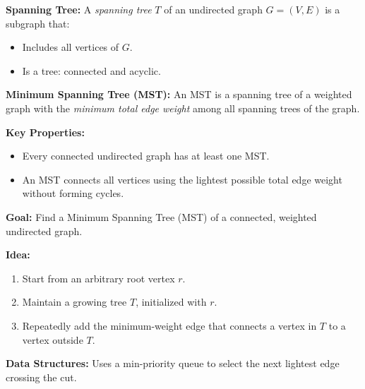 \documentclass[a4paper,landscape]{article}
\begin{document}
\begin{multicols}{7}
\tcolorbox[mybox={Spanning Trees}]
\textbf{Spanning Tree:}  
A \emph{spanning tree} $T$ of an undirected graph $G = (V, E)$ is a subgraph that:
\begin{itemize}[noitemsep, topsep=0pt]
    \item Includes all vertices of $G$.
    \item Is a tree: connected and acyclic.
\end{itemize}

\textbf{Minimum Spanning Tree (MST):}  
An MST is a spanning tree of a weighted graph with the \emph{minimum total edge weight} among all spanning trees of the graph.

\textbf{Key Properties:}
\begin{itemize}[noitemsep, topsep=0pt]
    \item Every connected undirected graph has at least one MST.
    \item An MST connects all vertices using the lightest possible total edge weight without forming cycles.
\end{itemize}
\endtcolorbox
\tcolorbox[mybox={Prim’s Algorithm}]
\textbf{Goal:} Find a Minimum Spanning Tree (MST) of a connected, weighted undirected graph.

\textbf{Idea:}
\begin{enumerate}[noitemsep, topsep=0pt]
    \item Start from an arbitrary root vertex $r$.
    \item Maintain a growing tree $T$, initialized with $r$.
    \item Repeatedly add the minimum-weight edge that connects a vertex in $T$ to a vertex outside $T$.
\end{enumerate}

\textbf{Data Structures:}
Uses a min-priority queue to select the next lightest edge crossing the cut.

\noindent %


\end{multicols}
\end{document}
